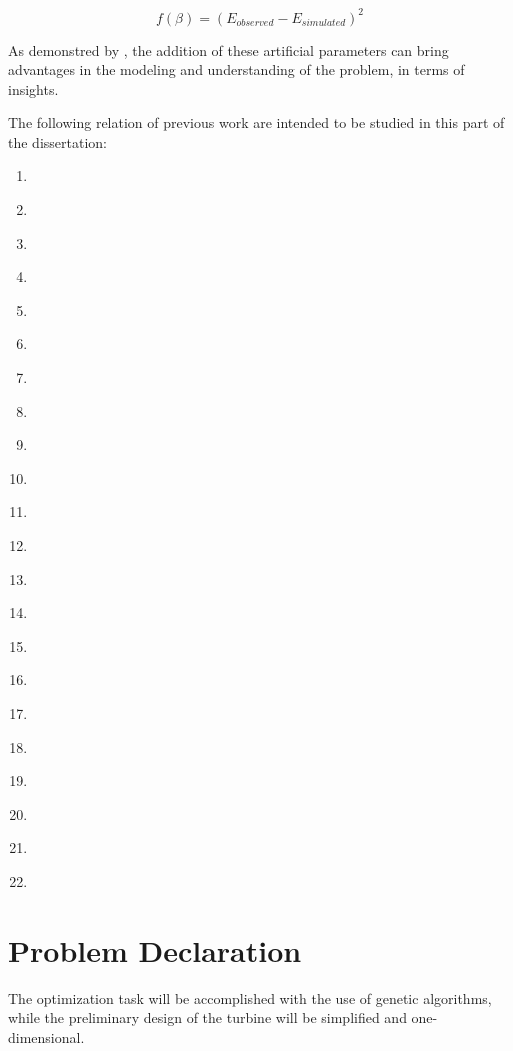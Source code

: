 \begin{equation}
f(\beta) = \left(E_{observed} - E_{simulated}\right)^2
\label{eq:reformulation}
\end{equation}

As demonstred by \cite{Deb2012}, the addition of these artificial parameters can bring advantages in the modeling and understanding of the problem, in terms of insights. 

The following relation of previous work are intended to be studied in this part of the dissertation:
\begin{enumerate}
    \item \cite{Mengistu2004}
    \item \cite{Asgarshamsi2014}
    \item \cite{Thorn2016}
    \item \cite{Arabnia2009}
    \item \cite{Cervantes2018}
    \item \cite{Juangphanich2019}
    \item \cite{Juangphanich2017}
    \item \cite{Agromayor2019}
    \item \cite{NooriRahimAbadi2017}
    \item \cite{Aminyavari2016}
    \item \cite{Ba2019}
    \item \cite{Lonard2008}
    \item \cite{ksz2010}
    \item \cite{Arabnia2012}
    \item \cite{Jenkins1982}
    \item \cite{Jenkins1983}
    \item \cite{Cervantes2018thesis}
    \item \cite{Sivashanmugam2011}
    \item \cite{Mengistu2005}
    \item \cite{Amano2003}
    \item \cite{Rao2012}
    \item \cite{Deb2012}
\end{enumerate}

\section{Problem Declaration}
The optimization task will be accomplished with the use of genetic algorithms, while the preliminary design of the turbine will be simplified and one-dimensional.

